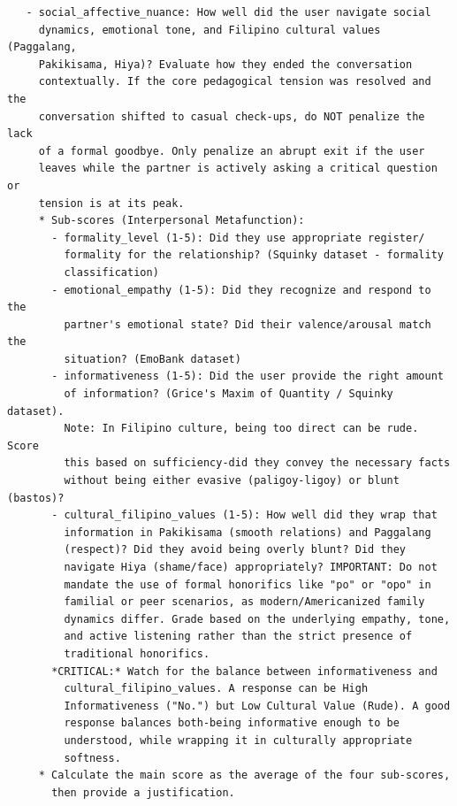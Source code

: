 \begin{verbatim}
   - social_affective_nuance: How well did the user navigate social 
     dynamics, emotional tone, and Filipino cultural values (Paggalang, 
     Pakikisama, Hiya)? Evaluate how they ended the conversation 
     contextually. If the core pedagogical tension was resolved and the 
     conversation shifted to casual check-ups, do NOT penalize the lack 
     of a formal goodbye. Only penalize an abrupt exit if the user 
     leaves while the partner is actively asking a critical question or 
     tension is at its peak.
     * Sub-scores (Interpersonal Metafunction):
       - formality_level (1-5): Did they use appropriate register/
         formality for the relationship? (Squinky dataset - formality 
         classification)
       - emotional_empathy (1-5): Did they recognize and respond to the 
         partner's emotional state? Did their valence/arousal match the 
         situation? (EmoBank dataset)
       - informativeness (1-5): Did the user provide the right amount 
         of information? (Grice's Maxim of Quantity / Squinky dataset). 
         Note: In Filipino culture, being too direct can be rude. Score 
         this based on sufficiency-did they convey the necessary facts 
         without being either evasive (paligoy-ligoy) or blunt (bastos)?
       - cultural_filipino_values (1-5): How well did they wrap that 
         information in Pakikisama (smooth relations) and Paggalang 
         (respect)? Did they avoid being overly blunt? Did they 
         navigate Hiya (shame/face) appropriately? IMPORTANT: Do not 
         mandate the use of formal honorifics like "po" or "opo" in 
         familial or peer scenarios, as modern/Americanized family 
         dynamics differ. Grade based on the underlying empathy, tone, 
         and active listening rather than the strict presence of 
         traditional honorifics.
       *CRITICAL:* Watch for the balance between informativeness and 
         cultural_filipino_values. A response can be High 
         Informativeness ("No.") but Low Cultural Value (Rude). A good 
         response balances both-being informative enough to be 
         understood, while wrapping it in culturally appropriate 
         softness.
     * Calculate the main score as the average of the four sub-scores, 
       then provide a justification.
   

\end{verbatim}
